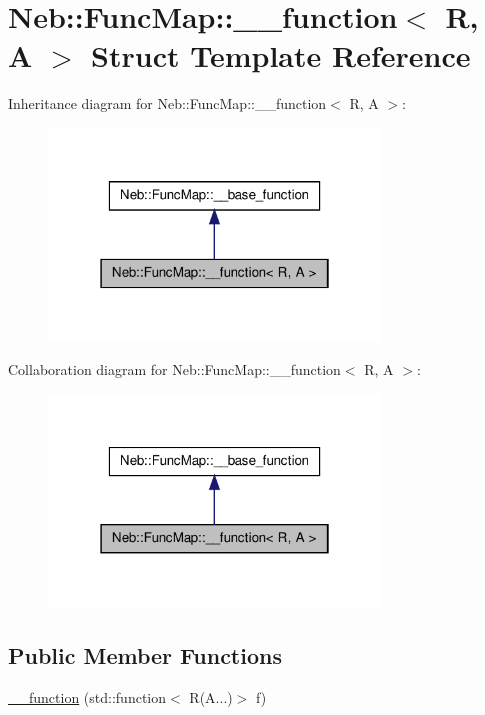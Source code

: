\hypertarget{structNeb_1_1FuncMap_1_1____function}{\section{\-Neb\-:\-:\-Func\-Map\-:\-:\-\_\-\-\_\-function$<$ \-R, \-A $>$ \-Struct \-Template \-Reference}
\label{structNeb_1_1FuncMap_1_1____function}
}


\-Inheritance diagram for \-Neb\-:\-:\-Func\-Map\-:\-:\-\_\-\-\_\-function$<$ \-R, \-A $>$\-:\nopagebreak
\begin{figure}[H]
\begin{center}
\leavevmode
\includegraphics[width=250pt]{structNeb_1_1FuncMap_1_1____function__inherit__graph}
\end{center}
\end{figure}


\-Collaboration diagram for \-Neb\-:\-:\-Func\-Map\-:\-:\-\_\-\-\_\-function$<$ \-R, \-A $>$\-:\nopagebreak
\begin{figure}[H]
\begin{center}
\leavevmode
\includegraphics[width=250pt]{structNeb_1_1FuncMap_1_1____function__coll__graph}
\end{center}
\end{figure}
\subsection*{\-Public \-Member \-Functions}
\begin{DoxyCompactItemize}
\item 
\hyperlink{structNeb_1_1FuncMap_1_1____function_af7f0ad9112fde31efada49064d2121c7}{\-\_\-\-\_\-function} (std\-::function$<$ \-R(\-A...)$>$ f)
\end{DoxyCompactItemize}
